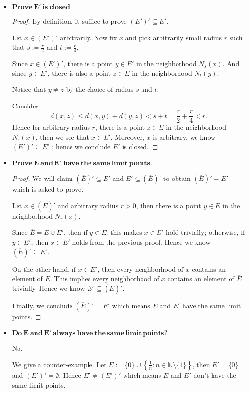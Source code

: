 \begin{Exercise}
\begin{itemize}
\item $\mathbf{Prove\ E'\ is\ closed.}$
\begin{proof}
By definition, it suffice to prove $(E')' \subseteq E'$. 

Let $x\in (E')'$ arbitrarily. Now fix $x$ and pick arbitrarily small radius $r$ such that $s := \frac{r}{2}$ and $t := \frac{r}{4}$.

Since $x\in (E')'$, there is a point $y\in E'$ in the neighborhood $N_s(x)$. And since $y\in E'$, there is also a point $z\in E$ in the neighborhood $N_t(y)$. 

Notice that $y\neq z$ by the choice of radius $s$ and $t$.

Consider
$$
d(x,z)
\leq d(x,y) + d(y,z)
< s + t
= \frac{r}{2} + \frac{r}{4}
< r.
$$
Hence for arbitrary radius $r$, there is a point $z\in E$ in the neighborhood $N_r(x)$, then we see that $x\in E'$. Moreover, $x$ is arbitrary, we know $(E')' \subseteq E'$ ; hence we conclude $E'$ is closed.
\end{proof}

\item $\mathbf{Prove\ E\ and\ E'\ have\ the\ same\ limit\ points.}$

\begin{proof}
We will claim $(\overline{E})' \subseteq E'$ and $E' \subseteq (\overline{E})'$ to obtain $(\overline{E})' = E'$ which is asked to prove.

Let $x\in (\overline{E})'$ and arbitrary radius $r > 0$, then there is a point $y\in \overline{E}$ in the neighborhood $N_r(x)$.

Since $\overline{E} = E\cup E'$, then if $y\in E$, this makes $x\in E'$ hold trivially; otherwise, if $y\in E'$, then $x\in E'$ holds from the previous proof. Hence we know $(\overline{E})' \subseteq E'$.

On the other hand, if $x\in E'$, then every neighborhood of $x$ contains an element of $E$. This implies every neighborhood of $x$ contains an element of $\overline{E}$ trivially. Hence we know $E' \subseteq (\overline{E})'$.

Finally, we conclude $(\overline{E})' = E'$ which means $E$ and $E'$ have the same limit points.
\end{proof}

\item $\mathbf{Do\ E\ and\ E'\ always\ have\ the\ same\ limit\ points?}$
\begin{solution}
No.

We give a counter-example.
Let $E := \{0\} \cup \left\{ \frac{1}{n}:n\in\mathbb{N}\setminus\{1\} \right\}$, then $E' = \{0\}$ and $(E')' = \emptyset$. Hence $E' \neq (E')'$ which means $E$ and $E'$ don't have the same limit points.


\end{solution}
\end{itemize}
\end{Exercise}
